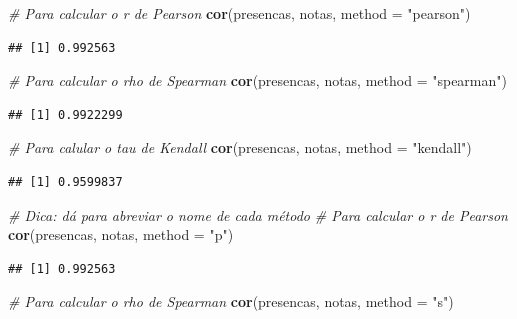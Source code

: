 \documentclass[
]{book}
\newenvironment{Shaded}{\begin{snugshade}}{\end{snugshade}}
\newcommand{\AttributeTok}[1]{\textcolor[rgb]{0.13,0.29,0.53}{#1}}
\newcommand{\CommentTok}[1]{\textcolor[rgb]{0.56,0.35,0.01}{\textit{#1}}}
\newcommand{\FunctionTok}[1]{\textcolor[rgb]{0.13,0.29,0.53}{\textbf{#1}}}
\newcommand{\NormalTok}[1]{#1}
\newcommand{\StringTok}[1]{\textcolor[rgb]{0.31,0.60,0.02}{#1}}
\begin{document}
\begin{Shaded}
\begin{Highlighting}[]
\CommentTok{\# Para calcular o r de Pearson}
\FunctionTok{cor}\NormalTok{(presencas, notas, }\AttributeTok{method =} \StringTok{"pearson"}\NormalTok{)}
\end{Highlighting}
\end{Shaded}

\begin{verbatim}
## [1] 0.992563
\end{verbatim}

\begin{Shaded}
\begin{Highlighting}[]
\CommentTok{\# Para calcular o rho de Spearman}
\FunctionTok{cor}\NormalTok{(presencas, notas, }\AttributeTok{method =} \StringTok{"spearman"}\NormalTok{)}
\end{Highlighting}
\end{Shaded}

\begin{verbatim}
## [1] 0.9922299
\end{verbatim}

\begin{Shaded}
\begin{Highlighting}[]
\CommentTok{\# Para calular o tau de Kendall}
\FunctionTok{cor}\NormalTok{(presencas, notas, }\AttributeTok{method =} \StringTok{"kendall"}\NormalTok{)}
\end{Highlighting}
\end{Shaded}

\begin{verbatim}
## [1] 0.9599837
\end{verbatim}

\begin{Shaded}
\begin{Highlighting}[]
\CommentTok{\# Dica: dá para abreviar o nome de cada método}
\CommentTok{\# Para calcular o r de Pearson}
\FunctionTok{cor}\NormalTok{(presencas, notas, }\AttributeTok{method =} \StringTok{"p"}\NormalTok{)}
\end{Highlighting}
\end{Shaded}

\begin{verbatim}
## [1] 0.992563
\end{verbatim}

\begin{Shaded}
\begin{Highlighting}[]
\CommentTok{\# Para calcular o rho de Spearman}
\FunctionTok{cor}\NormalTok{(presencas, notas, }\AttributeTok{method =} \StringTok{"s"}\NormalTok{)}
\end{Highlighting}
\end{Shaded}
\end{document}
